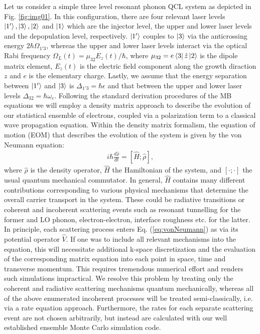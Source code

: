 \documentclass[10pt,letterpaper]{article}
\begin{document}
Let us consider a simple three level resonant phonon QCL system as depicted in Fig. \ref{fig:img01}. In this configuration, there are four relevant laser levels $\Ket{1'}, \Ket{3}, \Ket{2} $ and $\Ket{1}$ which are the injector level, the upper and lower laser levels and the depopulation level, respectively. $\Ket{1'}$ couples to $\Ket{3}$ via the anticrossing energy $2\hbar\Omega_{1'3}$, whereas the upper and lower laser levels interact via the optical Rabi frequency $\Omega_L(t)= \mu_{32}E_z(t)/\hbar$, where $\mu_{32} = e \Bra{3}\hat{z} \Ket{2}$ is the dipole matrix element, $E_z(t)$ is the electric field component along the growth diraction $z$ and $e$ is the elementary charge. Lastly, we assume that the energy separation between $\Ket{1'}$ and $\Ket{3}$ is $\Delta_{1'3} = \hbar \epsilon$ and that between the upper and lower laser levels $\Delta_{32} = \hbar \omega_c$.
Following the standard derivation procedures of the MB equations we will employ a density matrix approach to describe the evolution of our statistical ensemble of electrons, coupled via a polarization term to a classical wave propagation equation. 
Within the density matrix formalism,  the equation of motion (EOM) that describes the evolution of the system is given by the von Neumann equation:
\begin{align}
 \label{eq:vonNeumann}
 i\hbar \frac{d \hat{\rho}}{dt} = [\hat{H};\hat{\rho}] ,
\end{align}
where $\hat{\rho}$ is the density operator, $\hat{H}$ the Hamiltonian of the system, and $[\cdot;\cdot]$ the usual quantum mechanical commutator. In general, $\hat{H}$ contains many different contributions corresponding to various physical mechanisms that determine the overall carrier transport in the system. These could be radiative transitions or coherent and incoherent scattering events such as resonant tunnelling for the former and LO phonon, electron-electron, interface roughness etc. for the latter. In principle, each scattering process enters Eq. (\ref{eq:vonNeumann}) as via its potential operator $\hat{V}$. If one was to include all relevant mechanisms into the equation, this will necessitate additional k-space discretization and the evaluation of the corresponding matrix equation into each point in space, time and transverse momentum. This requires tremendous numerical effort and renders such simulations impractical. We resolve this problem by treating only the coherent and radiative scattering mechanisms quantum mechanically, whereas all of the above enumerated incoherent processes will be treated semi-classically, i.e. via a rate equation approach. Furthermore, the rates for each separate scattering event are not chosen arbitrarily, but instead are calculated with our well established ensemble Monte Carlo simulation code.
\end{document}
